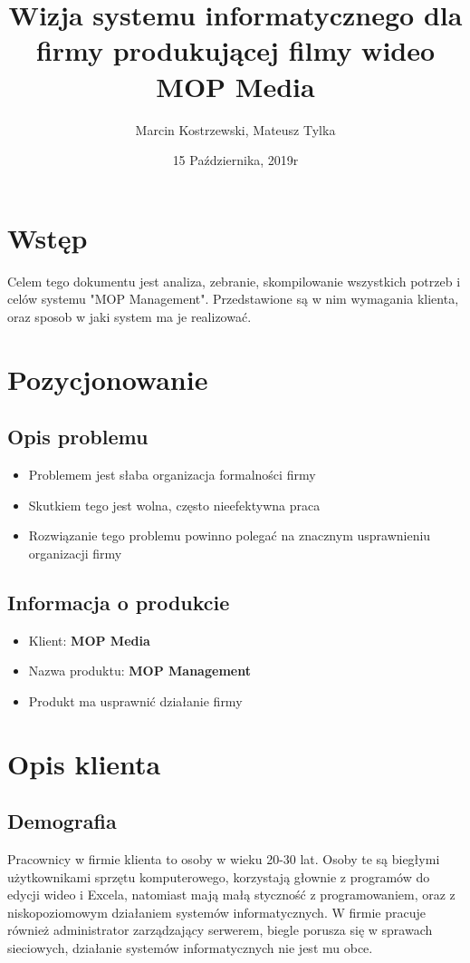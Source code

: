 \documentclass{article}
\title{Wizja systemu informatycznego dla firmy produkującej filmy wideo MOP Media}
\author{Marcin Kostrzewski, Mateusz Tylka}
\date{15 Października, 2019r}
\begin{document}
\maketitle
\newpage
\tableofcontents
\newpage

\section{Wstęp}
Celem tego dokumentu jest analiza, zebranie, skompilowanie wszystkich
potrzeb i celów systemu "MOP Management". Przedstawione są w nim wymagania klienta, oraz sposob  w jaki system ma je realizować.
\section{Pozycjonowanie}
\subsection{Opis problemu}
\begin{itemize}
    \item Problemem jest słaba organizacja formalności firmy
    \item Skutkiem tego jest wolna, często nieefektywna praca
    \item Rozwiązanie tego problemu powinno polegać na znacznym usprawnieniu organizacji firmy
\end{itemize}
\subsection{Informacja o produkcie}
\begin{itemize}
    \item Klient: \textbf{MOP Media}
    \item Nazwa produktu: \textbf{MOP Management}
    \item Produkt ma usprawnić działanie firmy
\end{itemize}
\section{Opis klienta}
\subsection{Demografia}
Pracownicy w firmie klienta to osoby w wieku 20-30 lat.
Osoby te są biegłymi użytkownikami sprzętu komputerowego, korzystają
głownie z programów do edycji wideo i Excela, natomiast mają małą
styczność z programowaniem, oraz z niskopoziomowym działaniem systemów
informatycznych. W firmie pracuje również administrator zarządzający
serwerem, biegle porusza się w sprawach sieciowych, działanie systemów
informatycznych nie jest mu obce.
\end{document}

